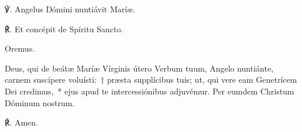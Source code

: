 
\noindent ℣. Angelus Dómini nuntiávit Maríæ.

\noindent ℟. Et concépit de Spíritu Sancto.


%
%

Oremus.

\noindent Deus, qui de beátæ Maríæ Vírginis útero Verbum tuum, Angelo nuntiánte, carnem suscípere voluísti:~† præsta supplícibus tuis; ut, qui vere eam Genetrícem Dei credimus,~* ejus apud te intercessiónibus adjuvémur. Per eumdem Christum Dóminum nostrum.

℟. Amen.